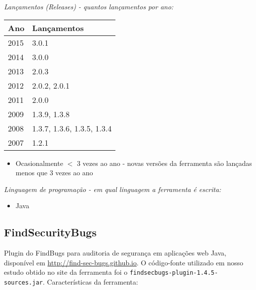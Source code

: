 \begin{description}

  \item {\it Lançamentos ({\it Releases}) - quantos lançamentos por ano:}
    \begin{table}[h!]
      \centering
      \begin{tabular}{| l | l |}
        \hline
        Ano  & Lançamentos                \\
        \hline
        2015 & 3.0.1                      \\
        2014 & 3.0.0                      \\
        2013 & 2.0.3                      \\
        2012 & 2.0.2, 2.0.1               \\
        2011 & 2.0.0                      \\
        2009 & 1.3.9, 1.3.8               \\
        2008 & 1.3.7, 1.3.6, 1.3.5, 1.3.4 \\
        2007 & 1.2.1                      \\
        \hline
      \end{tabular}
    \end{table}
    \begin{itemize}
      \item Ocasionalmente $<$ 3 vezes ao ano - novas versões da ferramenta são lançadas menos que 3 vezes ao ano
    \end{itemize}

  \item {\it Linguagem de programação - em qual linguagem a ferramenta é escrita:}
    \begin{itemize}
      \item Java
    \end{itemize}

\end{description}

\subsection{FindSecurityBugs}

Plugin do FindBugs para auditoria de segurança em aplicações web Java,
disponível em \url{http://find-sec-bugs.github.io}.  O código-fonte utilizado
em nosso estudo obtido no site da ferramenta foi o
\texttt{findsecbugs-plugin-1.4.5-sources.jar}. Características da ferramenta:

